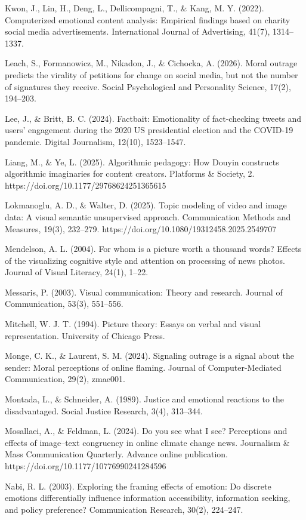 \documentclass[
]{article}
\begin{document}
Kwon, J., Lin, H., Deng, L., Dellicompagni, T., \& Kang, M. Y. (2022).
Computerized emotional content analysis: Empirical findings based on
charity social media advertisements. International Journal of
Advertising, 41(7), 1314--1337.

Leach, S., Formanowicz, M., Nikadon, J., \& Cichocka, A. (2026). Moral
outrage predicts the virality of petitions for change on social media,
but not the number of signatures they receive. Social Psychological and
Personality Science, 17(2), 194--203.

Lee, J., \& Britt, B. C. (2024). Factbait: Emotionality of fact-checking
tweets and users' engagement during the 2020 US presidential election
and the COVID-19 pandemic. Digital Journalism, 12(10), 1523--1547.

Liang, M., \& Ye, L. (2025). Algorithmic pedagogy: How Douyin constructs
algorithmic imaginaries for content creators. Platforms \& Society, 2.
https://doi.org/10.1177/29768624251365615

Lokmanoglu, A. D., \& Walter, D. (2025). Topic modeling of video and
image data: A visual semantic unsupervised approach. Communication
Methods and Measures, 19(3), 232--279.
https://doi.org/10.1080/19312458.2025.2549707

Mendelson, A. L. (2004). For whom is a picture worth a thousand words?
Effects of the visualizing cognitive style and attention on processing
of news photos. Journal of Visual Literacy, 24(1), 1--22.

Messaris, P. (2003). Visual communication: Theory and research. Journal
of Communication, 53(3), 551--556.

Mitchell, W. J. T. (1994). Picture theory: Essays on verbal and visual
representation. University of Chicago Press.

Monge, C. K., \& Laurent, S. M. (2024). Signaling outrage is a signal
about the sender: Moral perceptions of online flaming. Journal of
Computer-Mediated Communication, 29(2), zmae001.

Montada, L., \& Schneider, A. (1989). Justice and emotional reactions to
the disadvantaged. Social Justice Research, 3(4), 313--344.

Mosallaei, A., \& Feldman, L. (2024). Do you see what I see? Perceptions
and effects of image--text congruency in online climate change news.
Journalism \& Mass Communication Quarterly. Advance online publication.
https://doi.org/10.1177/10776990241284596

Nabi, R. L. (2003). Exploring the framing effects of emotion: Do
discrete emotions differentially influence information accessibility,
information seeking, and policy preference? Communication Research,
30(2), 224--247.
\end{document}
